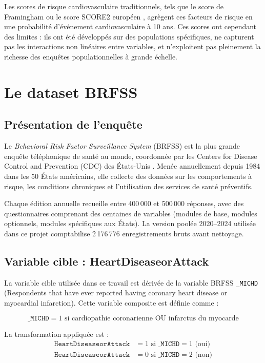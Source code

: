Les scores de risque cardiovasculaire traditionnels, tels que le score de Framingham \cite{wilson1998} ou le score SCORE2 européen \cite{score2}, agrègent ces facteurs de risque en une probabilité d'événement cardiovasculaire à 10 ans. Ces scores ont cependant des limites : ils ont été développés sur des populations spécifiques, ne capturent pas les interactions non linéaires entre variables, et n'exploitent pas pleinement la richesse des enquêtes populationnelles à grande échelle.

\section{Le dataset BRFSS}

\subsection{Présentation de l'enquête}

Le \textit{Behavioral Risk Factor Surveillance System} (BRFSS) est la plus grande enquête téléphonique de santé au monde, coordonnée par les Centers for Disease Control and Prevention (CDC) des États-Unis \cite{cdc_brfss}. Menée annuellement depuis 1984 dans les 50 États américains, elle collecte des données sur les comportements à risque, les conditions chroniques et l'utilisation des services de santé préventifs.

Chaque édition annuelle recueille entre 400\,000 et 500\,000 réponses, avec des questionnaires comprenant des centaines de variables (modules de base, modules optionnels, modules spécifiques aux États). La version poolée 2020--2024 utilisée dans ce projet comptabilise 2\,176\,776 enregistrements bruts avant nettoyage.

\subsection{Variable cible : HeartDiseaseorAttack}

La variable cible utilisée dans ce travail est dérivée de la variable BRFSS \texttt{\_MICHD} (Respondents that have ever reported having coronary heart disease or myocardial infarction). Cette variable composite est définie comme :

$$\texttt{\_MICHD} = 1 \text{ si cardiopathie coronarienne OU infarctus du myocarde}$$

La transformation appliquée est :
\begin{align*}
    \texttt{HeartDiseaseorAttack} &= 1 \text{ si } \texttt{\_MICHD} = 1 \text{ (oui)} \\
    \texttt{HeartDiseaseorAttack} &= 0 \text{ si } \texttt{\_MICHD} = 2 \text{ (non)}
\end{align*}


